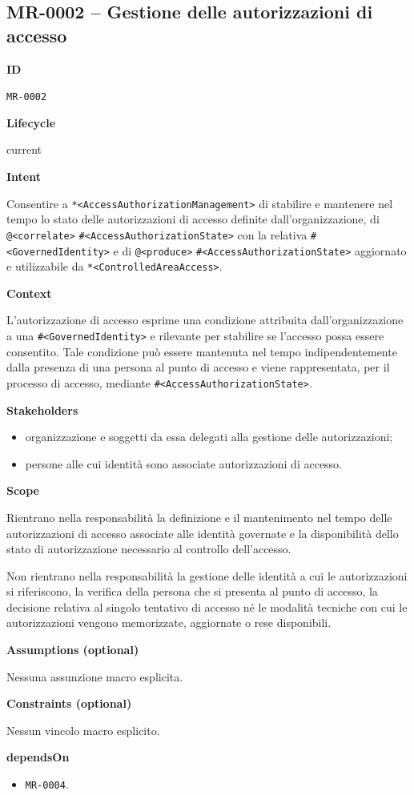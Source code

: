\documentclass[11pt,a4paper]{article}
\makeatletter
\newcommand{\bbeh}[1]{\texttt{*<#1>}}
\newcommand{\bnon}[1]{\texttt{\#<#1>}}
\newcommand{\baop}[1]{\texttt{@<#1>}}
\newcommand{\Field}[1]{\par\medskip\noindent\textbf{#1}\par\smallskip}
\newenvironment{compactitems}{\begin{itemize}[leftmargin=1.35em,itemsep=0.1em,topsep=0.2em,parsep=0pt]}{\end{itemize}}
\makeatother
\begin{document}
\noindent
\begin{minipage}[t]{0.64\textwidth}\small
\subsection*{MR-0002 -- Gestione delle autorizzazioni di accesso}

\Field{ID} \texttt{MR-0002}

\Field{Lifecycle} current

\Field{Intent}
Consentire a \bbeh{AccessAuthorizationManagement} di stabilire e mantenere nel tempo lo stato delle autorizzazioni di accesso definite dall'organizzazione, di \baop{correlate} \bnon{AccessAuthorizationState} con la relativa \bnon{GovernedIdentity} e di \baop{produce} \bnon{AccessAuthorizationState} aggiornato e utilizzabile da \bbeh{ControlledAreaAccess}.

\Field{Context}
L'autorizzazione di accesso esprime una condizione attribuita dall'organizzazione a una \bnon{GovernedIdentity} e rilevante per stabilire se l'accesso possa essere consentito. Tale condizione pu\`o essere mantenuta nel tempo indipendentemente dalla presenza di una persona al punto di accesso e viene rappresentata, per il processo di accesso, mediante \bnon{AccessAuthorizationState}.

\Field{Stakeholders}
\begin{compactitems}
  \item organizzazione e soggetti da essa delegati alla gestione delle autorizzazioni;
  \item persone alle cui identit\`a sono associate autorizzazioni di accesso.
\end{compactitems}

\Field{Scope}
Rientrano nella responsabilit\`a la definizione e il mantenimento nel tempo delle autorizzazioni di accesso associate alle identit\`a governate e la disponibilit\`a dello stato di autorizzazione necessario al controllo dell'accesso.

Non rientrano nella responsabilit\`a la gestione delle identit\`a a cui le autorizzazioni si riferiscono, la verifica della persona che si presenta al punto di accesso, la decisione relativa al singolo tentativo di accesso n\'e le modalit\`a tecniche con cui le autorizzazioni vengono memorizzate, aggiornate o rese disponibili.

\Field{Assumptions (optional)} Nessuna assunzione macro esplicita.

\Field{Constraints (optional)} Nessun vincolo macro esplicito.

\Field{dependsOn}
\begin{compactitems}
  \item \texttt{MR-0004}.
\end{compactitems}
\end{minipage}\hfill
\end{document}
